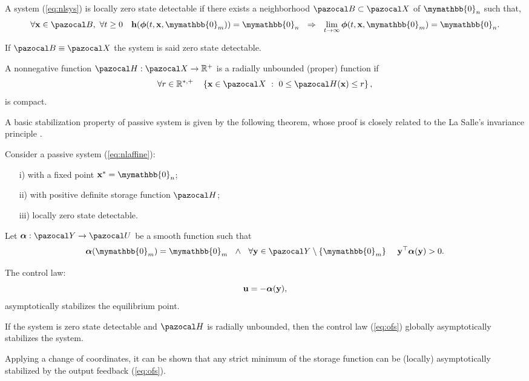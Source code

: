 \begin{defn}[Detectability]
	A system (\ref{eq:nlsys}) is locally zero state detectable if there exists a neighborhood $\B\subset\X$ of $\mymathbb{0}_n$ such that,
	\begin{equation}
	    \forall \xb\in \B,~\forall t\geq 0 \quad \hb(\bm\phi(t,\xb,\mymathbb{0}_m))=\mymathbb{0}_n~~\Rightarrow~~ \lim\limits_{t\rightarrow\infty}\bm\phi(t,\xb,\mymathbb{0}_m)=\mymathbb{0}_n.
    \end{equation}
	
	If $\B\equiv\X$ the system is said zero state detectable.
\end{defn}
%
%
\begin{defn}
	A nonnegative function $\Ha:\X\rightarrow\R^+$ is a radially unbounded (proper) function if
	\begin{equation}
	\forall r\in\R^{*,+}\quad  \left\{\xb\in\X~:~0\leq \Ha(\xb)\leq r \right\},
	\end{equation}
	is compact.
\end{defn}
%
A basic stabilization property of passive system is given by the following theorem, whose proof is closely related to the La Salle's invariance principle \citep{lasalle1960some}. 
%
\begin{thm}
	Consider a passive system (\ref{eq:nlaffine}):
	\begin{itemize}
	    \item[i)] with a fixed point $\xb^*=\mymathbb{0}_n$;
	    \item[ii)] with positive definite storage function $\Ha$;
	    \item[iii)] locally zero state detectable.
	\end{itemize}
	Let $\bm\alpha:\Y\rightarrow\U$ be a smooth function such that 
	\begin{equation}
	    \bm\alpha(\mymathbb{0}_m)=\mymathbb{0}_m~~\land~~ \forall \yb\in\Y\setminus\{\mymathbb{0}_m\}~~~~\yb^\top\bm\alpha(\yb)>0.
	\end{equation}
	
	The control law:
	\begin{equation}\label{eq:ofs}
	\mathbf{u}=-\bm\alpha(\mathbf{y}),
	\end{equation}
	asymptotically stabilizes the equilibrium point.
\end{thm}
%
\begin{cor}
    If the system is zero state detectable and $\Ha$ is radially unbounded, then the control law (\ref{eq:ofs}) globally asymptotically stabilizes the system.
\end{cor}
%
Applying a change of coordinates, it can be shown that any strict minimum of the storage function can be (locally) asymptotically stabilized by the output feedback (\ref{eq:ofs}).
%
\newline

